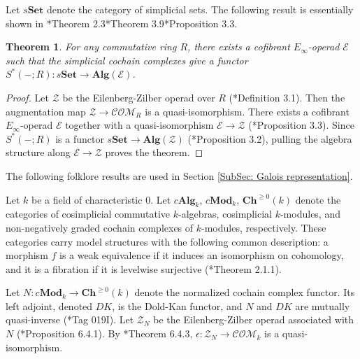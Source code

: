 \documentclass[11pt]{amsart}
\newtheorem{theorem}{Theorem}[section]
\theoremstyle{definition}
\numberwithin{equation}{section}
\numberwithin{equation}{section}
\begin{document}
Let $s\textbf{Set}$ denote the category of simplicial sets. The following result is essentially shown in \cite{Hinich-Schechtman}*{Theorem 2.3}\cite{May-operads-sheaf-cohomology}*{Theorem 3.9}\cite{May-operads-sheaf-cohomology}*{Proposition 3.3}\cite{Mandell-cochain-multiplications}\cite{Hinich-Model-Structure-on-homotopy-algbras}\cite{Berger-Moerdijk-axiomatic-homotopy-theory-operads}\cite{McClure-Smith}.

\begin{theorem}\label{Thm: simplicial cochain complex is a functorial E-infinity algebra}
For any commutative ring $R$,
there exists a cofibrant $E_{\infty}$-operad $\mathcal{E}$ such that the simplicial cochain complexes give a functor $S^*(-;R):s\textbf{Set}\rightarrow \mathbf{Alg}(\mathcal{E})$.
\end{theorem}

\begin{proof}
Let $\mathcal{Z}$ be the Eilenberg-Zilber operad over $R$ (\cite{May-operads-sheaf-cohomology}*{Definition 3.1}). Then the augmentation map $\mathcal{Z}\rightarrow \mathcal{COM}_R$ is a quasi-isomorphism. There exists a cofibrant $E_{\infty}$-operad $\mathcal{E}$ together with a quasi-isomorphism $\mathcal{E}\rightarrow \mathcal{Z}$ (\cite{May-operads-sheaf-cohomology}*{Proposition 3.3}). Since $S^*(-;R)$ is a functor $s\textbf{Set}\rightarrow \mathbf{Alg}(\mathcal{Z})$ (\cite{May-operads-sheaf-cohomology}*{Proposition 3.2}), pulling the algebra structure along $\mathcal{E}\rightarrow \mathcal{Z}$ proves the theorem.
\end{proof}

The following folklore results are used in Section \ref{SubSec: Galois representation}.

Let $k$ be a field of characteristic $0$. Let $c\mathbf{Alg}_k$, $c\mathbf{Mod}_k$, $\mathbf{Ch}^{\geq 0}(k)$ denote the categories of cosimplicial commutative $k$-algebras, cosimplicial $k$-modules, and non-negatively graded cochain complexes of $k$-modules, respectively. These categories carry model structures with the following common description: a morphism $f$ is a weak equivalence if it induces an isomorphism on cohomology, and it is a fibration if it is levelwise surjective (\cite{Toen-affine-stacks}*{Theorem 2.1.1}).

Let $N:c\mathbf{Mod}_k\rightarrow \mathbf{Ch}^{\geq 0}(k)$ denote the normalized cochain complex functor. Its left adjoint, denoted $DK$, is the Dold-Kan functor, and $N$ and $DK$ are mutually quasi-inverse (\cite{stacks-project}*{Tag 019I}).  Let $\mathcal{Z}_N$ be the Eilenberg-Zilber operad associated with $N$ (\cite{Richter-cosimplicial-algebras-and-normalization-functor}*{Proposition 6.4.1}). By \cite{Richter-cosimplicial-algebras-and-normalization-functor}*{Theorem 6.4.3}, $\epsilon: \mathcal{Z}_N\rightarrow \mathcal{COM}_k$ is a quasi-isomorphism.
\end{document}
